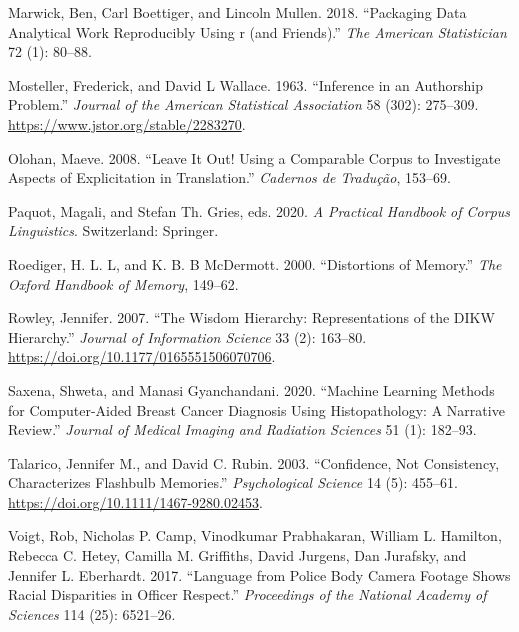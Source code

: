 \documentclass[
  letterpaper,
]{latex/krantz}
\newlength{\cslhangindent}
\newlength{\cslentryspacingunit} %
\newenvironment{CSLReferences}[2] %
 {%
  \setlength{\parindent}{0pt}
  \ifodd #1
  \let\oldpar\par
  \def\par{\hangindent=\cslhangindent\oldpar}
  \fi
  \setlength{\parskip}{#2\cslentryspacingunit}
 }%
 {}
\begin{document}
\begin{CSLReferences}{1}{0}
\leavevmode{}%
Marwick, Ben, Carl Boettiger, and Lincoln Mullen. 2018. {``Packaging
Data Analytical Work Reproducibly Using r (and Friends).''} \emph{The
American Statistician} 72 (1): 80--88.

\leavevmode{}%
Mosteller, Frederick, and David L Wallace. 1963. {``Inference in an
Authorship Problem.''} \emph{Journal of the American Statistical
Association} 58 (302): 275--309.
\url{https://www.jstor.org/stable/2283270}.

\leavevmode{}%
Olohan, Maeve. 2008. {``Leave It Out! Using a Comparable Corpus to
Investigate Aspects of Explicitation in Translation.''} \emph{Cadernos
de Tradução}, 153--69.

\leavevmode{}%
Paquot, Magali, and Stefan Th. Gries, eds. 2020. \emph{A Practical
Handbook of Corpus Linguistics}. Switzerland: Springer.

\leavevmode{}%
Roediger, H. L. L, and K. B. B McDermott. 2000. {``Distortions of
Memory.''} \emph{The Oxford Handbook of Memory}, 149--62.

\leavevmode{}%
Rowley, Jennifer. 2007. {``The Wisdom Hierarchy: Representations of the
DIKW Hierarchy.''} \emph{Journal of Information Science} 33 (2):
163--80. \url{https://doi.org/10.1177/0165551506070706}.

\leavevmode{}%
Saxena, Shweta, and Manasi Gyanchandani. 2020. {``Machine Learning
Methods for Computer-Aided Breast Cancer Diagnosis Using Histopathology:
A Narrative Review.''} \emph{Journal of Medical Imaging and Radiation
Sciences} 51 (1): 182--93.

\leavevmode{}%
Talarico, Jennifer M., and David C. Rubin. 2003. {``Confidence, Not
Consistency, Characterizes Flashbulb Memories.''} \emph{Psychological
Science} 14 (5): 455--61. \url{https://doi.org/10.1111/1467-9280.02453}.

\leavevmode{}%
Voigt, Rob, Nicholas P. Camp, Vinodkumar Prabhakaran, William L.
Hamilton, Rebecca C. Hetey, Camilla M. Griffiths, David Jurgens, Dan
Jurafsky, and Jennifer L. Eberhardt. 2017. {``Language from Police Body
Camera Footage Shows Racial Disparities in Officer Respect.''}
\emph{Proceedings of the National Academy of Sciences} 114 (25):
6521--26.


\end{CSLReferences}
\end{document}
